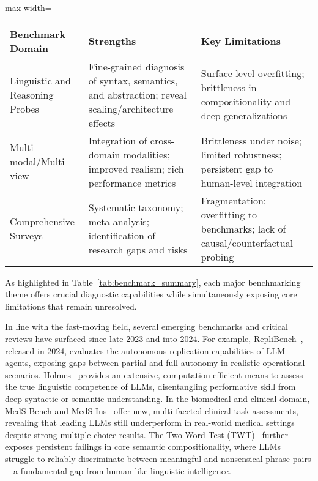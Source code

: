 \documentclass[sigconf]{acmart}
\begin{document}
\begin{table*}[htbp]
  \centering
  \caption{Comparison of Major Benchmark Themes and Identified Limitations}
  \label{tab:benchmark_summary}
  \begin{adjustbox}{max width=\textwidth}
  \begin{tabular}{lll}
    \toprule
    \textbf{Benchmark Domain} & \textbf{Strengths} & \textbf{Key Limitations} \\
    \midrule
    Linguistic and Reasoning Probes & Fine-grained diagnosis of syntax, semantics, and abstraction; reveal scaling/architecture effects & Surface-level overfitting; brittleness in compositionality and deep generalizations \\
    Multi-modal/Multi-view & Integration of cross-domain modalities; improved realism; rich performance metrics & Brittleness under noise; limited robustness; persistent gap to human-level integration \\
    Comprehensive Surveys & Systematic taxonomy; meta-analysis; identification of research gaps and risks & Fragmentation; overfitting to benchmarks; lack of causal/counterfactual probing \\
    \bottomrule
  \end{tabular}
  \end{adjustbox}
\end{table*}

As highlighted in Table~\ref{tab:benchmark_summary}, each major benchmarking theme offers crucial diagnostic capabilities while simultaneously exposing core limitations that remain unresolved.

In line with the fast-moving field, several emerging benchmarks and critical reviews have surfaced since late 2023 and into 2024. For example, RepliBench~\cite{ref23}, released in 2024, evaluates the autonomous replication capabilities of LLM agents, exposing gaps between partial and full autonomy in realistic operational scenarios. Holmes~\cite{ref97} provides an extensive, computation-efficient means to assess the true linguistic competence of LLMs, disentangling performative skill from deep syntactic or semantic understanding. In the biomedical and clinical domain, MedS-Bench and MedS-Ins~\cite{ref95} offer new, multi-faceted clinical task assessments, revealing that leading LLMs still underperform in real-world medical settings despite strong multiple-choice results. The Two Word Test (TWT)~\cite{ref96} further exposes persistent failings in core semantic compositionality, where LLMs struggle to reliably discriminate between meaningful and nonsensical phrase pairs---a fundamental gap from human-like linguistic intelligence.
\end{document}
